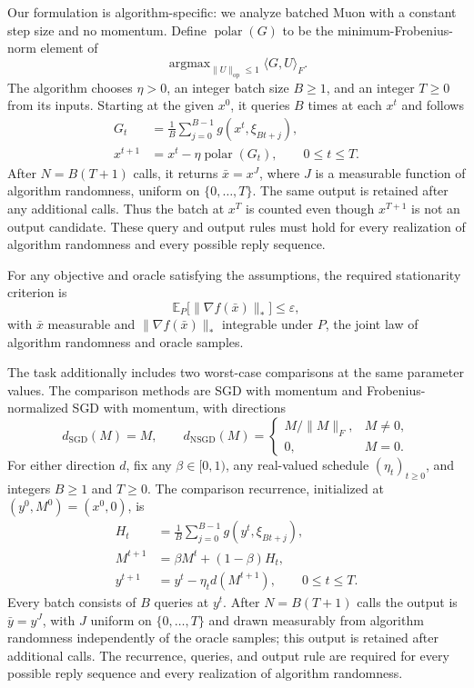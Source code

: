 \documentclass[10pt]{article}
\theoremstyle{definition}
\begin{document}
Our formulation is algorithm-specific: we analyze batched Muon with a constant step size and no momentum. Define $\operatorname{polar}(G)$ to be the minimum-Frobenius-norm element of
\[
\mathop{\operatorname{argmax}}_{\|U\|_{\mathrm{op}}\leq1}
\langle G,U\rangle_F.
\]
The algorithm chooses $\eta>0$, an integer batch size $B\geq1$, and an integer $T\geq0$ from its inputs. Starting at the given $x^0$, it queries $B$ times at each $x^t$ and follows
\[
\begin{aligned}
G_t&=\frac1B\sum_{j=0}^{B-1}g(x^t,\xi_{Bt+j}),\\
x^{t+1}&=x^t-\eta\operatorname{polar}(G_t),
\qquad 0\leq t\leq T.
\end{aligned}
\]
After $N=B(T+1)$ calls, it returns $\bar{x}=x^J$, where $J$ is a measurable function of algorithm randomness, uniform on $\{0,\ldots,T\}$. The same output is retained after any additional calls. Thus the batch at $x^T$ is counted even though $x^{T+1}$ is not an output candidate. These query and output rules must hold for every realization of algorithm randomness and every possible reply sequence.

For any objective and oracle satisfying the assumptions, the required stationarity criterion is
\[
\mathbb{E}_{P}\bigl[\|\nabla f(\bar{x})\|_*\bigr]\leq\varepsilon,
\]
with $\bar{x}$ measurable and $\|\nabla f(\bar{x})\|_*$ integrable under $P$, the joint law of algorithm randomness and oracle samples.

The task additionally includes two worst-case comparisons at the same parameter values. The comparison methods are SGD with momentum and Frobenius-normalized SGD with momentum, with directions
\[
d_{\mathrm{SGD}}(M)=M,\qquad
 d_{\mathrm{NSGD}}(M)=
\begin{cases}
M/\|M\|_F,&M\ne0,\\
0,&M=0.
\end{cases}
\]
For either direction $d$, fix any $\beta\in[0,1)$, any real-valued schedule $(\eta_t)_{t\geq0}$, and integers $B\geq1$ and $T\geq0$. The comparison recurrence, initialized at $(y^0,M^0)=(x^0,0)$, is
\[
\begin{aligned}
H_t&=\frac1B\sum_{j=0}^{B-1}g(y^t,\xi_{Bt+j}),\\
M^{t+1}&=\beta M^t+(1-\beta)H_t,\\
y^{t+1}&=y^t-\eta_t d(M^{t+1}),
\qquad 0\leq t\leq T.
\end{aligned}
\]
Every batch consists of $B$ queries at $y^t$. After $N=B(T+1)$ calls the output is $\bar{y}=y^J$, with $J$ uniform on $\{0,\ldots,T\}$ and drawn measurably from algorithm randomness independently of the oracle samples; this output is retained after additional calls. The recurrence, queries, and output rule are required for every possible reply sequence and every realization of algorithm randomness.
\end{document}
